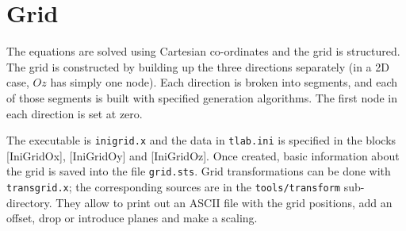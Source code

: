 \chapter{Grid}\label{sec:grid}

The equations are solved using Cartesian co-ordinates and the grid is structured. The grid is constructed by building up the three directions separately (in a 2D case, $Oz$ has simply one node).  Each direction is broken into segments, and each of those segments is built with specified generation algorithms. The first node in each direction is set at zero.

The executable is {\tt inigrid.x} and the data in {\tt tlab.ini} is specified in the blocks [IniGridOx], [IniGridOy] and [IniGridOz]. Once created, basic information about the grid is saved into the file {\tt grid.sts}. Grid transformations can be done with {\tt transgrid.x}; the corresponding sources are in the {\tt tools/transform} sub-directory. They allow to print out an ASCII file with the grid positions, add an offset, drop or introduce planes and make a scaling.%

